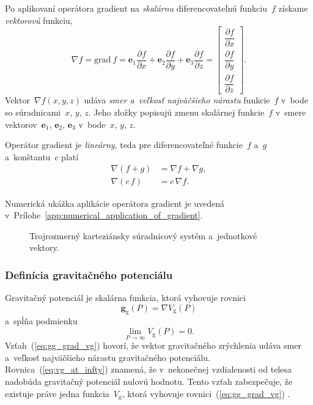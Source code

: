 \documentclass[a4paper,12pt]{book}
\newcommand{\grad}{\mathrm{grad}}
\newcommand{\gidx}{\mathrm g}
\let\vec\mathbf
\begin{document}
Po aplikovaní operátora gradient na \emph{skalárnu} diferencovateľnú 
funkciu~$f$ získame \emph{vektorovú} funkciu,
%
\begin{equation}
\nabla f = \grad \ f = \vec e_1 \frac{\partial f}{\partial x} + \vec e_2 
\frac{\partial
f}{\partial y} + \vec e_3 \frac{\partial f}{\partial z} =
\begin{bmatrix}
\dfrac{\partial f}{\partial x} \\[2ex]
\dfrac{\partial f}{\partial y} \\[2ex]
\dfrac{\partial f}{\partial z}
\end{bmatrix}
{.}
\end{equation}
%
Vektor~$\nabla f(x, y, z)$ udáva \emph{smer a~veľkosť najväčšieho nárastu} 
funkcie~$f$ v~bode so súradnicami~$x$, $y$, $z$.  Jeho zložky popisujú zmenu 
skalárnej funkcie~$f$ v~smere vektorov~$\vec e_1$, $\vec e_2$, $\vec e_3$ 
v~bode~$x$, $y$, $z$.

Operátor gradient je \emph{lineárny}, teda pre diferencovateľné funkcie~$f$ 
a~$g$ a~konštantu~$c$ platí
%
\begin{align}
\label{eq:gradient_additivity}
\nabla \left(f + g \right) &= \nabla f + \nabla g{,}\\
%
\label{eq:gradient_homogenity}
\nabla (c \, f) &= c \, \nabla f{.}
\end{align}

Numerická ukážka aplikácie operátora gradient je uvedená 
v~Prílohe~\ref{app:numerical_application_of_gradient}.

\begin{figure}
\centering

\caption{Trojrozmerný karteziánsky súradnicový systém a~jednotkové vektory.}
\label{fig:3d_coord_system}
\end{figure}

\subsubsection{Definícia gravitačného potenciálu}

Gravitačný potenciál je skalárna funkcia, ktorá vyhovuje rovnici 
\parencite{SansoGeoidDetermination}
%
\begin{equation}
\label{eq:gg_grad_vg}
\vec g_\gidx(P) = \nabla V_\gidx(P)
\end{equation}
%
a~spĺňa podmienku
%
\begin{equation}
\label{eq:vg_at_infty}
\lim_{P \to \infty} V_\gidx(P) = 0{.}
\end{equation}
%
Vzťah~(\ref{eq:gg_grad_vg}) hovorí, že vektor gravitačného zrýchlenia udáva 
smer a~veľkosť najväčšieho nárastu gravitačného potenciálu.  
Rovnica~(\ref{eq:vg_at_infty}) znamená, že v~nekonečnej vzdialenosti od telesa 
nadobúda gravitačný potenciál nulovú hodnotu.  Tento vzťah zabezpečuje, že 
existuje práve jedna funkcia~$V_\gidx$, ktorá vyhovuje 
rovnici~(\ref{eq:gg_grad_vg}) \parencite{SansoGeoidDetermination}.
\end{document}
